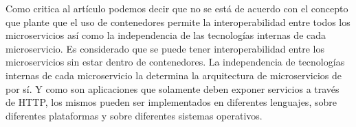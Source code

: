 Como critica al artículo podemos decir que no se está de acuerdo con el concepto que plante que
el uso de contenedores permite la interoperabilidad entre todos los microservicios así como la independencia de las tecnologías internas de cada microservicio.
Es considerado que se puede tener interoperabilidad entre los microservicios sin estar dentro de contenedores. La independencia de tecnologías internas de cada microservicio la determina la arquitectura de microservicios de por sí. Y como son aplicaciones que solamente deben exponer servicios a través de HTTP, los mismos pueden ser implementados en diferentes lenguajes, sobre diferentes plataformas y sobre diferentes sistemas operativos.\par
